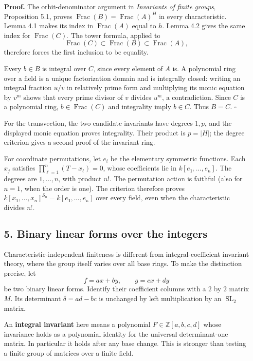 \documentclass[
]{article}
\begin{document}
\textbf{Proof.} The orbit-denominator argument in \emph{Invariants of
finite groups}, Proposition 5.1, proves
\(\operatorname{Frac}(B)=\operatorname{Frac}(A)^H\) in every
characteristic. Lemma 4.1 makes its index in \(\operatorname{Frac}(A)\)
equal to \(h\). Lemma 4.2 gives the same index for
\(\operatorname{Frac}(C)\). The tower formula, applied to \[
\operatorname{Frac}(C)\subset\operatorname{Frac}(B)\subset\operatorname{Frac}(A),
\] therefore forces the first inclusion to be equality.

Every \(b\in B\) is integral over \(C\), since every element of \(A\)
is. A polynomial ring over a field is a unique factorization domain and
is integrally closed: writing an integral fraction \(u/v\) in relatively
prime form and multiplying its monic equation by \(v^m\) shows that
every prime divisor of \(v\) divides \(u^m\), a contradiction. Since
\(C\) is a polynomial ring, \(b\in\operatorname{Frac}(C)\) and
integrality imply \(b\in C\). Thus \(B=C\). \(\square\)

For the transvection, the two candidate invariants have degrees \(1,p\),
and the displayed monic equation proves integrality. Their product is
\(p=|H|\); the degree criterion gives a second proof of the invariant
ring.

For coordinate permutations, let \(e_i\) be the elementary symmetric
functions. Each \(x_j\) satisfies \(\prod_{\ell=1}^n(T-x_\ell)=0\),
whose coefficients lie in \(k [e_1,\ldots,e_n]\). The degrees are
\(1,\ldots,n\), with product \(n!\). The permutation action is faithful
(also for \(n=1\), when the order is one). The criterion therefore
proves \(k [x_1,\ldots,x_n]^{S_n}=k [e_1,\ldots,e_n]\) over every field,
even when the characteristic divides \(n!\).

\subsection{5. Binary linear forms over the
integers}\label{binary-linear-forms-over-the-integers}

Characteristic-independent finiteness is different from
integral-coefficient invariant theory, where the group itself varies
over all base rings. To make the distinction precise, let \[
f=ax+by,\qquad g=cx+dy
\] be two binary linear forms. Identify their coefficient columns with a
\(2\) by \(2\) matrix \(M\). Its determinant \(\delta=ad-bc\) is
unchanged by left multiplication by an \(\operatorname{SL}_2\) matrix.

An \textbf{integral invariant} here means a polynomial
\(F\in\mathbb Z [a,b,c,d]\) whose invariance holds as a polynomial
identity for the universal determinant-one matrix. In particular it
holds after any base change. This is stronger than testing a finite
group of matrices over a finite field.
\end{document}
